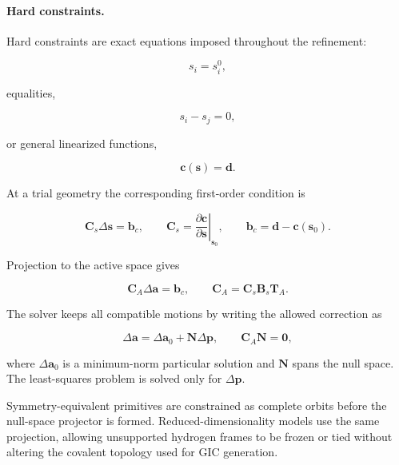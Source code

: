 \documentclass[aip,jcp,reprint,longbibliography,floatfix]{revtex4-2}
\begin{document}
\paragraph{Hard constraints.}

Hard constraints are exact equations imposed throughout the refinement:

\begin{equation}
s_i=s_i^{0},
\end{equation}

equalities,

\begin{equation}
s_i-s_j=0,
\end{equation}

or general linearized functions,

\begin{equation}
\mathbf{c}(\mathbf{s})=\mathbf{d}.
\end{equation}

At a trial geometry the corresponding first-order condition is

\begin{equation}
\mathbf{C}_s
\Delta\mathbf{s}
=
\mathbf{b}_c,
\qquad
\mathbf{C}_s =
\left.
\frac{\partial\mathbf{c}}
{\partial\mathbf{s}}
\right|_{\mathbf{s}_0},
\qquad
\mathbf{b}_c=\mathbf{d}-\mathbf{c}(\mathbf{s}_0).
\end{equation}

Projection to the active space gives

\begin{equation}
\mathbf{C}_{A}
\Delta\mathbf{a}
=
\mathbf{b}_c,
\qquad
\mathbf{C}_{A}
=
\mathbf{C}_s
\mathbf{B}_s
\mathbf{T}_{A}.
\end{equation}

The solver keeps all compatible motions by writing the allowed correction as

\begin{equation}
\Delta\mathbf{a}
=
\Delta\mathbf{a}_0
+
\mathbf{N}\Delta\mathbf{p},
\qquad
\mathbf{C}_{A}\mathbf{N}=\mathbf{0},
\end{equation}

where $\Delta\mathbf{a}_0$ is a minimum-norm particular solution and
$\mathbf{N}$ spans the null space. The least-squares problem is solved only
for $\Delta\mathbf{p}$.

Symmetry-equivalent primitives are constrained as complete orbits before the
null-space projector is formed. Reduced-dimensionality models use the same projection, 
allowing unsupported hydrogen frames to be frozen or tied without altering the covalent topology
used for GIC generation.
\end{document}
